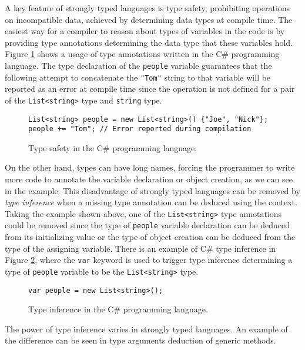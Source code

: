 A key feature of strongly typed languages is type safety, prohibiting operations on incompatible data, achieved by determining data types at compile time. 
The easiest way for a compiler to reason about types of variables in the code is by providing type annotations determining the data type that these variables hold. 
Figure \ref{img01:csharp_type_sef} shows a usage of type annotations written in the C\# programming language.
The type declaration of the \texttt{people} variable guarantees that the following attempt to concatenate the \texttt{"Tom"} string to that variable will be reported as an error at compile time since the operation is not defined for a pair of the \texttt{List<string>} type and \texttt{string} type.
\begin{figure}[h]
\begin{lstlisting}[style=csharp]
List<string> people = new List<string>() {"Joe", "Nick"};
people += "Tom"; // Error reported during compilation
\end{lstlisting}
\caption{Type safety in the C\# programming language.}
\label{img01:csharp_type_sef}
\end{figure}
\par
On the other hand, types can have long names, forcing the programmer to write more code to annotate the variable declaration or object creation, as we can see in the example.
This disadvantage of strongly typed languages can be removed by \textit{type inference} when a missing type annotation can be deduced using the context. 
Taking the example shown above, one of the \texttt{List<string>} type annotations could be removed since the type of \texttt{people} variable declaration can be deduced from its initializing value or the type of object creation can be deduced from the type of the assigning variable.
There is an example of C\# type inference in Figure \ref{img02:csharp_type_inf}, where the \texttt{var} keyword is used to trigger type inference determining a type of \texttt{people} variable to be the \texttt{List<string>} type.
\begin{figure}[h]
\begin{lstlisting}[style=csharp]
var people = new List<string>();
\end{lstlisting}
\caption{Type inference in the C\# programming language.}
\label{img02:csharp_type_inf}
\end{figure}
\par
The power of type inference varies in strongly typed languages.
An example of the difference can be seen in type arguments deduction of generic methods. 
